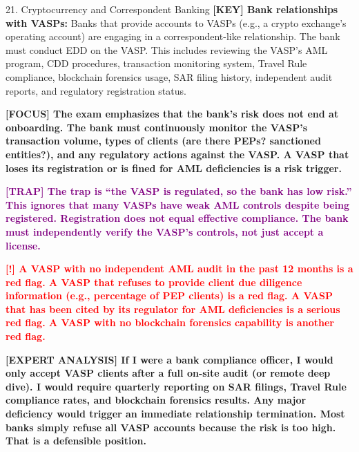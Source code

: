 \documentclass[11pt,a4paper]{beamer}
\newcommand{\redflag}[1]{\textcolor{red}{\textbf{[!] #1}}}
\newcommand{\examfocus}[1]{\textcolor{orange!80!black}{\textbf{[FOCUS] #1}}}
\newcommand{\trap}[1]{\textcolor{purple}{\textbf{[TRAP] #1}}}
\newcommand{\keyterm}[1]{\textcolor{red!80!black}{\textbf{[KEY] #1}}}
\newcommand{\expert}[1]{\textcolor{blue!70!black}{\textbf{[EXPERT ANALYSIS] #1}}}
\begin{document}
	\begin{frame}{21. Cryptocurrency and Correspondent Banking}
		\tiny
		\keyterm{Bank relationships with VASPs:} Banks that provide accounts to VASPs (e.g., a crypto exchange's operating account) are engaging in a correspondent-like relationship. The bank must conduct EDD on the VASP. This includes reviewing the VASP's AML program, CDD procedures, transaction monitoring system, Travel Rule compliance, blockchain forensics usage, SAR filing history, independent audit reports, and regulatory registration status.
		
		\vspace{0.1cm}
		\examfocus{The exam emphasizes that the bank's risk does not end at onboarding. The bank must continuously monitor the VASP's transaction volume, types of clients (are there PEPs? sanctioned entities?), and any regulatory actions against the VASP. A VASP that loses its registration or is fined for AML deficiencies is a risk trigger.}
		
		\vspace{0.1cm}
		\trap{The trap is “the VASP is regulated, so the bank has low risk.” This ignores that many VASPs have weak AML controls despite being registered. Registration does not equal effective compliance. The bank must independently verify the VASP's controls, not just accept a license.}
		
		\vspace{0.1cm}
		\redflag{A VASP with no independent AML audit in the past 12 months is a red flag. A VASP that refuses to provide client due diligence information (e.g., percentage of PEP clients) is a red flag. A VASP that has been cited by its regulator for AML deficiencies is a serious red flag. A VASP with no blockchain forensics capability is another red flag.}
		
		\vspace{0.1cm}
		\expert{If I were a bank compliance officer, I would only accept VASP clients after a full on-site audit (or remote deep dive). I would require quarterly reporting on SAR filings, Travel Rule compliance rates, and blockchain forensics results. Any major deficiency would trigger an immediate relationship termination. Most banks simply refuse all VASP accounts because the risk is too high. That is a defensible position.}
	\end{frame}
	
\end{document}
